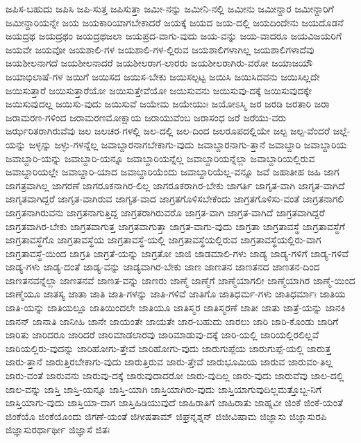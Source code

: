{ಜಪಿಸ-ಬಹುದು
ಜಪಿಸಿ
ಜಪಿ-ಸುತ್ತ
ಜಪಿಸುತ್ತಾ
ಜಮೀ-ನನ್ನು
ಜಮೀನಿ-ನಲ್ಲಿ
ಜಮೀನು
ಜಮೀನ್ದಾರ
ಜಮೀನ್ದಾರಿಗೆ
ಜಮೀನ್ದಾರಿಯನ್ನೇ
ಜಯ
ಜಯಕಾರಿಯಾಗಬೇಕಾದರೆ
ಜಯಕ್ಕೆ
ಜಯದ
ಜಯ-ದಲ್ಲಿ
ಜಯದಿಂದೇನು
ಜಯದೊಡನೆ
ಜಯದ್ರಥ
ಜಯದ್ರಥಂ
ಜಯದ್ರಥಜಲಾ
ಜಯಪ್ರದ-ವಾಗು-ವುದು
ಜಯ-ವನ್ನು
ಜಯ-ವಾದರೂ
ಜಯವಿಜಯರಿಗೆ
ಜಯವೇ
ಜಯವೋ
ಜಯಶಾಲಿ-ಗಳ
ಜಯಶಾಲಿ-ಗಳ-ಲ್ಲಿರುವ
ಜಯಶಾಲಿಗಳಾಗಿಲ್ಲ
ಜಯಶಾಲಿಗಳಾದೆವು
ಜಯಶೀಲನಾಗದೆ
ಜಯಶೀಲನಾದರೆ
ಜಯಶೀಲರಾಗ-ಲಾರರು
ಜಯಶೀಲರಾಗಿರು-ವರೋ
ಜಯಾಜಯೌ
ಜಯಾಭಿಲಾಷೆ-ಗಳ
ಜಯಿಗೆ
ಜಯಿಸದ
ಜಯಿಸ-ಬೇಕು
ಜಯಿಸಲ್ಪಟ್ಟ
ಜಯಿಸಿ
ಜಯಿಸಿದವನು
ಜಯಿಸಿಲ್ಲದೇ
ಜಯಿಸುತ್ತಾರೆ
ಜಯಿಸುತ್ತಾರೆಯೋ
ಜಯಿಸುತ್ತೇವೆಯೋ
ಜಯಿಸುವನು
ಜಯಿಸುವು-ದಕ್ಕೆ
ಜಯಿಸುವುದಕ್ಕೇ
ಜಯಿಸುವುದಲ್ಲ
ಜಯಿಸು-ವುದು
ಜಯಿಸುವೆ
ಜಯೇಮ
ಜಯೇಯುಃ
ಜಯೋಽಸ್ಮಿ
ಜರ
ಜರಡಿ
ಜರತಾರಿ
ಜರಾ
ಜರಾಮರಣ-ಗಳಿಂದ
ಜರಾಮರಣಮೋಕ್ಷಾಯ
ಜರಾಯುವೆಂಬ
ಜರಾಸಂಧ
ಜರೆ
ಜರೆಯು-ವರು
ಜರ್ಝರಿತರಾಗಿರುವೆವು
ಜಲ
ಜಲಚರ-ಗಳಲ್ಲಿ
ಜಲ-ದಲ್ಲಿ
ಜಲ-ದಿಂದ
ಜಲರೂಪದಲ್ಲಿಯೇ
ಜಲ್ಪ
ಜಲ್ಪ-ವೆಂದರೆ
ಜಲ್ಲೆ-ಯನ್ನು
ಜಳ್ಳನ್ನು
ಜಳ್ಳು-ಗಳನ್ನೆಲ್ಲ
ಜವಾಬ್ದಾರನಾಗಬೇಕಾಗು-ವುದು
ಜವಾಬ್ದಾರನಾಗು-ತ್ತಾನೆ
ಜವಾಬ್ದಾರಿ
ಜವಾಬ್ದಾರಿಯ
ಜವಾಬ್ದಾರಿ-ಯನ್ನು
ಜವಾಬ್ದಾರಿ-ಯನ್ನೂ
ಜವಾಬ್ದಾರಿಯನ್ನೆಲ್ಲ
ಜವಾಬ್ದಾರಿಯನ್ನೆಲ್ಲಾ
ಜವಾಬ್ದಾರಿಯಲ್ಲಿರುವ
ಜವಾಬ್ದಾರಿಯಲ್ಲೇ
ಜವಾಬ್ದಾರಿ-ಯಾದ
ಜವಾಬ್ದಾರಿಯೆಂದು
ಜವಾಬ್ದಾರಿಯೆಲ್ಲ-ವನ್ನೂ
ಜವೆ
ಜಹಾತೀಹ
ಜಹಿ
ಜಾಗ
ಜಾಗತ್ರವಾಗಿಲ್ಲ
ಜಾಗರಣೆ
ಜಾಗರೂಕನಾಗಿರ-ಲಿಲ್ಲ
ಜಾಗರೂಕರಾಗಿರ-ಬೇಕು
ಜಾಗರ್ತಿ
ಜಾಗೃತ-ವಾಗಿ
ಜಾಗೃತ-ವಾಗಿದೆ
ಜಾಗೃತವಾಗಿದ್ದರೆ
ಜಾಗೃತ-ವಾಗಿರುವ
ಜಾಗೃತ-ವಾದ
ಜಾಗ್ರತಗೊಳಿಸಬೇಕೆಂದು
ಜಾಗ್ರತಗೊಳಿಸು-ವಂತೆ
ಜಾಗ್ರತನಾಗಲಿ
ಜಾಗ್ರತನಾಗಿರುವನು
ಜಾಗ್ರತನಾಗುತ್ತಿದ್ದ
ಜಾಗ್ರತರಾಗಿರುವರೊ
ಜಾಗ್ರತ-ವಾಗಿ
ಜಾಗ್ರತ-ವಾಗಿದೆ
ಜಾಗ್ರತವಾಗಿದ್ದರೆ
ಜಾಗ್ರತವಾಗಿರ-ಬೇಕು
ಜಾಗ್ರತವಾಗುತ್ತ
ಜಾಗ್ರತವಾಗುತ್ತಾ
ಜಾಗ್ರತ-ವಾಗು-ವುದು
ಜಾಗ್ರತಾ
ಜಾಗ್ರತಾವಸ್ಥೆ
ಜಾಗ್ರತಾವಸ್ಥೆಗೆ
ಜಾಗ್ರತಾವಸ್ಥೆಗೊ
ಜಾಗ್ರತಾವಸ್ಥೆಯ
ಜಾಗ್ರತಾವಸ್ಥೆ-ಯಲ್ಲಿ
ಜಾಗ್ರತಾವಸ್ಥೆಯಲ್ಲಿರುವ
ಜಾಗ್ರತಾವಸ್ಥೆಯಲ್ಲಿರು-ವಾಗ
ಜಾಗ್ರತಾವಸ್ಥೆ-ಯಿಂದ
ಜಾಗ್ರತಿ
ಜಾಗ್ರತೆ-ಯನ್ನು
ಜಾಗ್ರತೋ
ಜಾಜಿ
ಜಾಡಮಾಲಿ-ಗಳು
ಜಾಡ್ಯ
ಜಾಡ್ಯ-ಗಳಿಗೆ
ಜಾಡ್ಯ-ಗಳಿವೆ
ಜಾಡ್ಯ-ಗಳು
ಜಾಡ್ಯ-ದಂತೆ
ಜಾಡ್ಯ-ವನ್ನು
ಜಾಡ್ಯವಾಗಿರ-ಬೇಕು
ಜಾಣ
ಜಾಣತನ
ಜಾಣತನದ
ಜಾಣತನ-ದಿಂದ
ಜಾಣತನವನ್ನೆಲ್ಲಾ
ಜಾಣತನವೆ
ಜಾಣತ-ವನ್ನು
ಜಾಣರು
ಜಾಣ್ಮೆ
ಜಾಣ್ಮೆಗೆ
ಜಾಣ್ಮೆಯಾಗಲೀ
ಜಾಣ್ಮೆಯಾಗಿರ
ಜಾಣ್ಮೆ-ಯಿಂದ
ಜಾಣ್ಮೆಯೂ
ಜಾತಸ್ಯ
ಜಾತಾ
ಜಾತಿ
ಜಾತಿ-ಗಳನ್ನು
ಜಾತಿ-ಗಳಿವೆ
ಜಾತಿಗೊ
ಜಾತಿಧರ್ಮ-ಗಳು
ಜಾತಿಧರ್ಮಾಃ
ಜಾತಿಯ
ಜಾತಿ-ಯನ್ನು
ಜಾತಿಯಲ್ಲೂ
ಜಾತಿಯಿಂದಲೇ
ಜಾತಿಯೂ
ಜಾತಿಸ್ಮರ
ಜಾತಿಸ್ಮರಣೆ
ಜಾತೀ
ಜಾತು
ಜಾತ್ರೆ-ಯನ್ನು
ಜಾನಕಿ
ಜಾನನ್
ಜಾನಾತಿ
ಜಾನೀಹಿ
ಜಾನೇ
ಜಾಯಂತೇ
ಜಾಯತೇ
ಜಾರ-ಬಹುದು
ಜಾರಲು
ಜಾರಿ
ಜಾರಿ-ಕೊಂಡು
ಜಾರಿಗೆ
ಜಾರಿತು
ಜಾರಿದರೂ
ಜಾರಿದರೆ
ಜಾರಿಮಾಡಲಾರವು
ಜಾರಿಮಾಡುವು-ದಕ್ಕೆ
ಜಾರಿ-ಯಲ್ಲಿ
ಜಾರಿಯಲ್ಲಿರಲಿಲ್ಲವೆ
ಜಾರಿಯಲ್ಲಿರು-ವುದನ್ನು
ಜಾರಿಹೋಗು-ತ್ತೇವೆ
ಜಾರಿಹೋಗು-ವುದು
ಜಾರುಗುಪ್ಪೆಯ
ಜಾರುಗುಪ್ಪೆ-ಯಲ್ಲಿ
ಜಾರುತ್ತ
ಜಾರು-ತ್ತಾನೆ
ಜಾರುತ್ತಿರಬೇಕಾಗು-ವುದು
ಜಾರುತ್ತಿರುವ
ಜಾರು-ತ್ತೇವೆ
ಜಾರುಭೂಮಿಯ
ಜಾರುವ
ಜಾರುವಂ-ತಿಲ್ಲ
ಜಾರು-ವಂತೆ
ಜಾರುವನು
ಜಾರುವು-ದಕ್ಕೆ
ಜಾರುವುದಾದರೋ
ಜಾರು-ವುದಿಲ್ಲ
ಜಾರು-ವುದು
ಜಾರುವೆವು
ಜಾಲ-ದಲ್ಲಿ
ಜಾಲ-ವನ್ನು
ಜಾಸ್ತಿ
ಜಾಸ್ತಿ-ಯನ್ನೂ
ಜಾಸ್ತಿ-ಯಾಗಿ
ಜಾಸ್ತಿಯಾಗಿರು-ವುದು
ಜಾಸ್ತಿಯಾಗುವುದಿಲ್ಲಮತ್ತೊಬ್ಬ-ನಿಗೆ
ಜಾಸ್ತಿಯಾಗು-ವುದು
ಜಾಸ್ತಿಯಾ-ದಾಗ
ಜಾಸ್ತಿಹಿಡಿಯುವುದೆ
ಜಾಹಿರಾತಿಗೆ
ಜಾಹಿರಾತು
ಜಾಹ್ನವೀ
ಜಿಂಕೆ
ಜಿಂಕೆ-ಯಂತೆ
ಜಿಂಕೆಯೊ
ಜಿಂಕೆಯೊಂದು
ಜಿಗಣೆ-ಯಂತೆ
ಜಿಗೀಷತಾಮ್
ಜಿಘ್ರನ್ನಶ್ನನ್
ಜಿಜೀವಿಷಾಮ
ಜಿಜ್ಞಾಸು
ಜಿಜ್ಞಾಸುರಪಿ
ಜಿಜ್ಞಾಸುರರ್ಥಾರ್ಥೀ
ಜಿಜ್ಞಾಸೆ
ಜಿತಃ
}
